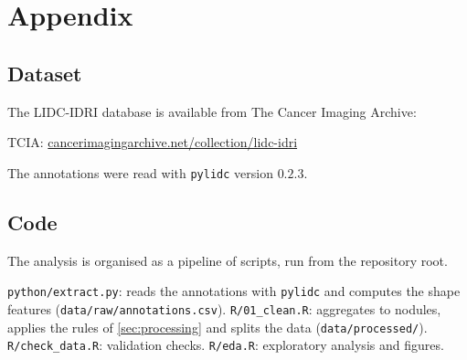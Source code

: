 \documentclass[12pt]{article}
\begin{document}
\appendix
\section{Appendix}

\subsection{Dataset}

The LIDC-IDRI database\cite{armato2011lidc} is available from The
Cancer Imaging Archive\cite{clark2013tcia}:
\begin{itemize}
  \ii TCIA:
    \href{https://www.cancerimagingarchive.net/collection/lidc-idri/}
    {cancerimagingarchive.net/collection/lidc-idri}
\end{itemize}
The annotations were read with \texttt{pylidc} version $0.2.3$\cite{hancock2016pylidc}.

\subsection{Code}

The analysis is organised as a pipeline of scripts, run from the
repository root.
\begin{itemize}
  \ii \texttt{python/extract.py}: reads the annotations with
    \texttt{pylidc} and computes the shape features
    (\texttt{data/raw/annotations.csv}).
  \ii \texttt{R/01\_clean.R}: aggregates to nodules, applies the
    rules of \cref{sec:processing} and splits the data (\texttt{data/processed/}).
  \ii \texttt{R/check\_data.R}: validation checks.
  \ii \texttt{R/eda.R}: exploratory analysis and figures.
\end{itemize}



\end{document}
